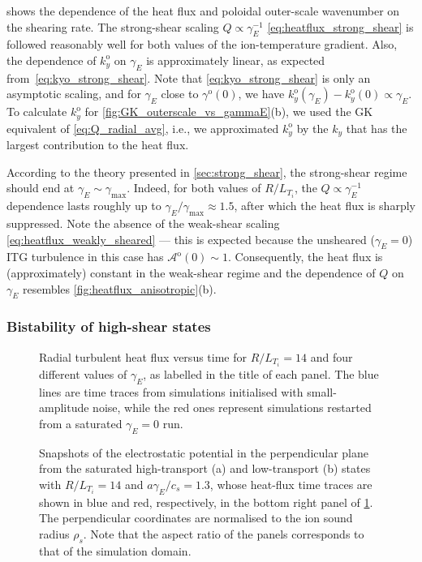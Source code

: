 \documentclass{jpp}
\newcommand{\kyo}{k_y^\text{o}}
\newcommand{\kyoO}{k_{y}^\text{o}(0)}
\newcommand{\gammaoO}{\gamma^\text{o}(0)}
\newcommand{\gammaE}{\gamma_{E}}
\newcommand{\A}{\mathcal{A}}
\newcommand{\AoO}{\A^\text{o}(0)}
\begin{document}
 shows the dependence of the heat flux and poloidal outer-scale wavenumber on the shearing rate. The strong-shear scaling \(Q \propto \gammaE^{-1}\) \cref{eq:heatflux_strong_shear} is followed reasonably well for both values of the ion-temperature gradient. Also, the dependence of \(\kyo\) on \(\gammaE\) is approximately linear, as expected from~\cref{eq:kyo_strong_shear}. Note that \cref{eq:kyo_strong_shear} is only an asymptotic scaling, and for \(\gammaE\) close to \(\gammaoO\), we have \(\kyo(\gammaE) - \kyoO \propto \gammaE\). To calculate \(\kyo\) for \cref{fig:GK_outerscale_vs_gammaE}(b), we used the GK equivalent of \cref{eq:Q_radial_avg}, i.e., we  approximated \(\kyo\) by the \(k_y\) that has the largest contribution to the heat flux.

According to the theory presented in \cref{sec:strong_shear}, the strong-shear regime should end at \(\gammaE \sim \gamma_\text{max}\). Indeed, for both values of \(R/L_{T_i}\), the \(Q \propto \gammaE^{-1}\) dependence lasts roughly up to \(\gammaE/\gamma_\text{max} \approx 1.5\), after which the heat flux is sharply suppressed. Note the absence of the weak-shear scaling \cref{eq:heatflux_weakly_sheared} --- this is expected because the unsheared (\(\gammaE = 0\)) ITG turbulence in this case has \(\AoO \sim 1\). Consequently, the heat flux is (approximately) constant in the weak-shear regime and the dependence of \(Q\) on \(\gammaE\) resembles \cref{fig:heatflux_anisotropic}(b).

\subsubsection{Bistability of high-shear states}

\begin{figure}
	\caption{Radial turbulent heat flux versus time for \mbox{\(R/L_{T_i} = 14\)} and four different values of \(\gammaE\), as labelled in the title of each panel. The blue lines are time traces from simulations initialised with small-amplitude noise, while the red ones represent simulations restarted from a saturated \(\gammaE=0\) run.}
	\label{fig:GK_hf}
\end{figure}

\begin{figure}
	\centering
	
	\caption{Snapshots of the electrostatic potential in the perpendicular plane from the saturated high-transport (a) and low-transport (b) states with \(R/L_{T_i} = 14\) and \mbox{\(a\gammaE/c_s = 1.3\)}, whose heat-flux time traces are shown in blue and red, respectively, in the bottom right panel of \cref{fig:GK_hf}. The perpendicular coordinates are normalised to the ion sound radius \(\rho_s\). Note that the aspect ratio of the panels corresponds to that of the simulation domain. }
	\label{fig:GK_ferds}
\end{figure}
\end{document}
